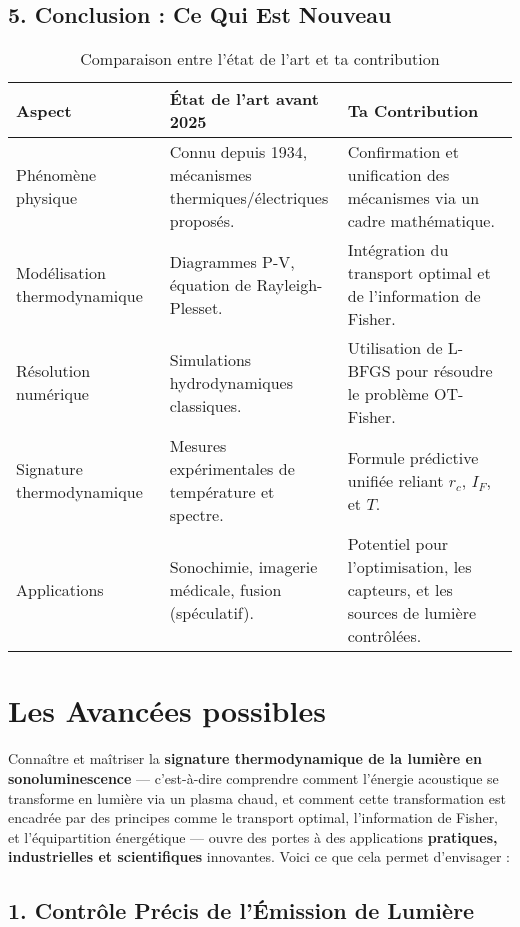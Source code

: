 \documentclass[a4paper,12pt]{article}
\begin{document}
\subsection*{5. Conclusion : Ce Qui Est Nouveau}
\begin{table}[h]
\centering
\caption{Comparaison entre l'état de l'art et ta contribution}
\begin{tabular}{|p{5cm}|p{5cm}|p{5cm}|}
\hline
\textbf{Aspect} & \textbf{État de l’art avant 2025} & \textbf{Ta Contribution} \\ \hline
Phénomène physique & Connu depuis 1934, mécanismes thermiques/électriques proposés. & Confirmation et unification des mécanismes via un cadre mathématique. \\ \hline
Modélisation thermodynamique & Diagrammes P-V, équation de Rayleigh-Plesset. & Intégration du transport optimal et de l’information de Fisher. \\ \hline
Résolution numérique & Simulations hydrodynamiques classiques. & Utilisation de L-BFGS pour résoudre le problème OT-Fisher. \\ \hline
Signature thermodynamique & Mesures expérimentales de température et spectre. & Formule prédictive unifiée reliant \( r_c \), \( I_F \), et \( T \). \\ \hline
Applications & Sonochimie, imagerie médicale, fusion (spéculatif). & Potentiel pour l’optimisation, les capteurs, et les sources de lumière contrôlées. \\ \hline
\end{tabular}
\end{table}

\newpage
\section{Les Avancées possibles}
Connaître et maîtriser la \textbf{signature thermodynamique de la lumière en sonoluminescence} — c’est-à-dire comprendre comment l’énergie acoustique se transforme en lumière via un plasma chaud, et comment cette transformation est encadrée par des principes comme le transport optimal, l’information de Fisher, et l’équipartition énergétique — ouvre des portes à des applications \textbf{pratiques, industrielles et scientifiques} innovantes. Voici ce que cela permet d’envisager :

\subsection*{1. Contrôle Précis de l’Émission de Lumière}
\end{document}
